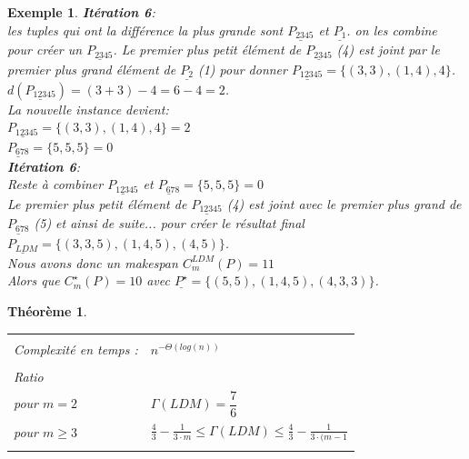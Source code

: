\documentclass[a4paper,12pt]{report}
\theoremstyle{plain}				%
\newtheorem{theoreme}{Théorème}	%
\newtheorem{example}{Exemple}
\theoremstyle{definition}				%
\begin{document}
\begin{itemize}
\begin{example}
\textbf{Itération 6}:\\
les tuples qui ont la différence la plus grande sont
$\underline{P_{2345}}$  et $\underline{P_{1}}$.
on les combine pour créer un $\underline{P_{2345}}$. Le premier plus petit élément de $\underline{P_{2345}}$ (4) est joint par le premier plus grand élément de $\underline{P_{2}}$ (1) pour donner  $\underline{P_{12345}} = \{(3,3),(1,4),4\}$.
$d(\underline{P_{12345}}) = (3+3)-4 = 6-4=2$.\\
La nouvelle instance devient:\\
$\underline{P_{12345}} = \{(3,3),(1,4),4\}=2$\\
$\underline{P_{678}} = \{5,5,5\}=0$\\

\textbf{Itération 6}:\\
Reste à combiner $\underline{P_{12345}}$ et $\underline{P_{678}} = \{5,5,5\}=0$\\
Le premier plus petit élément de $\underline{P_{12345}}$ (4) est joint avec le premier plus grand de  $\underline{P_{678}}$ (5) et ainsi de suite... pour créer le résultat final \\
$\underline{P_{LDM}}= \{(3,3,5),(1,4,5),(4,5)\}$.\\

Nous avons donc un makespan $C_m^{LDM}(P) = 11 $ \\
Alors que $C_m^{\star}(P) = 10$ avec $\underline{P^{\star}}= \{(5,5),(1,4,5),(4,3,3)\}$.
\end{example}

\end{itemize}



\begin{theoreme}
\begin{flushleft}
\begin{tabular}{|p{8cm}p{6cm}|}
\hline
& \\
Complexité en temps \cite{michiels2003performance}:& $n^{- \Theta (log(n))}$
\\	%
& \\
Ratio \cite{michiels2003performance} &\\
pour $m=2$						& $\Gamma(LDM) = \dfrac{7}{6}$\\
pour $m\geq 3$					& $ \frac{4}{3}-\frac{1}{3 \cdot m} \leq
   									\Gamma(LDM) 						\leq
   									\frac{4}{3}-\frac{1}{3 \cdot (m-1}$
\\
& \\
\hline
\end{tabular}
\end{flushleft}

\end{theoreme}
\end{document}
